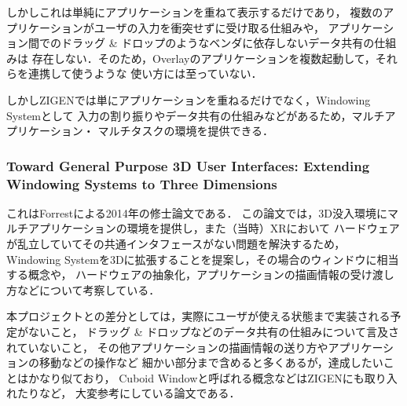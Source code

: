 しかしこれは単純にアプリケーションを重ねて表示するだけであり，
複数のアプリケーションがユーザの入力を衝突せずに受け取る仕組みや，
アプリケーション間でのドラッグ \& ドロップのようなベンダに依存しないデータ共有の仕組みは
存在しない．そのため，Overlayのアプリケーションを複数起動して，それらを連携して使うような
使い方には至っていない．

しかしZIGENでは単にアプリケーションを重ねるだけでなく，Windowing Systemとして
入力の割り振りやデータ共有の仕組みなどがあるため，マルチアプリケーション・
マルチタスクの環境を提供できる．

\subsubsection{
  Toward General Purpose 3D User Interfaces:
  Extending Windowing Systems to Three Dimensions \cite{forrest}
}
\label{section:forrest}

これはForrestによる2014年の修士論文である．
この論文では，3D没入環境にマルチアプリケーションの環境を提供し，また（当時）XRにおいて
ハードウェアが乱立していてその共通インタフェースがない問題を解決するため，
Windowing Systemを3Dに拡張することを提案し，その場合のウィンドウに相当する概念や，
ハードウェアの抽象化，アプリケーションの描画情報の受け渡し方などについて考察している．

本プロジェクトとの差分としては，実際にユーザが使える状態まで実装される予定がないこと，
ドラッグ \& ドロップなどのデータ共有の仕組みについて言及されていないこと，
その他アプリケーションの描画情報の送り方やアプリケーションの移動などの操作など
細かい部分まで含めると多くあるが，達成したいことはかなり似ており，
Cuboid Windowと呼ばれる概念などはZIGENにも取り入れたりなど，
大変参考にしている論文である．

